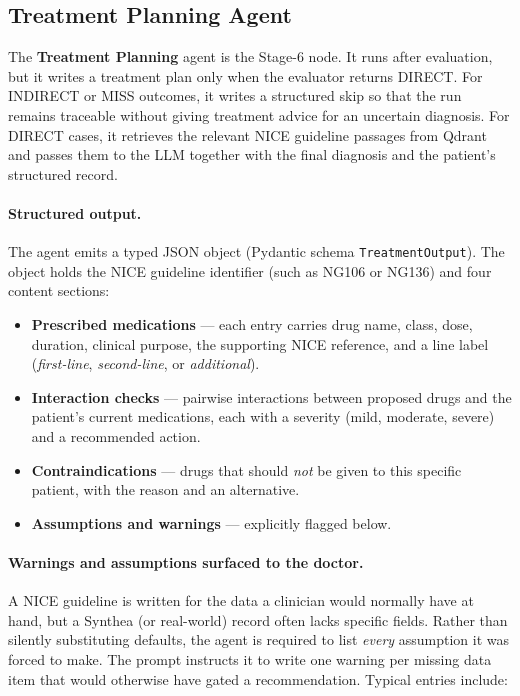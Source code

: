 \FloatBarrier
\subsection{Treatment Planning Agent}
\label{sec:agent_tx}
The \textbf{Treatment Planning} agent is the Stage-6 node. It runs after
evaluation, but it writes a treatment plan only when the evaluator returns
DIRECT. For INDIRECT or MISS outcomes, it writes a structured skip so that
the run remains traceable without giving treatment advice for an uncertain
diagnosis. For DIRECT cases, it retrieves the relevant NICE guideline
passages from Qdrant and passes them to the LLM together with the final
diagnosis and the patient's structured record.

\paragraph{Structured output.} The agent emits a typed JSON object
(Pydantic schema \texttt{TreatmentOutput}). The object holds the NICE
guideline identifier (such as NG106 or NG136) and four content
sections:

\begin{itemize}
  \item \textbf{Prescribed medications} --- each entry carries drug name,
        class, dose, duration, clinical purpose, the supporting NICE
        reference, and a line label (\textit{first-line},
        \textit{second-line}, or \textit{additional}).
  \item \textbf{Interaction checks} --- pairwise interactions between
        proposed drugs and the patient's current medications, each with a
        severity (mild, moderate, severe) and a recommended action.
  \item \textbf{Contraindications} --- drugs that should \emph{not} be
        given to this specific patient, with the reason and an
        alternative.
  \item \textbf{Assumptions and warnings} --- explicitly flagged below.
\end{itemize}

\paragraph{Warnings and assumptions surfaced to the doctor.} A NICE
guideline is written for the data a clinician would normally have at
hand, but a Synthea (or real-world) record often lacks specific fields.
Rather than silently substituting defaults, the agent is required to
list \emph{every} assumption it was forced to make. The prompt instructs
it to write one warning per missing data item that would otherwise have
gated a recommendation. Typical entries include:

